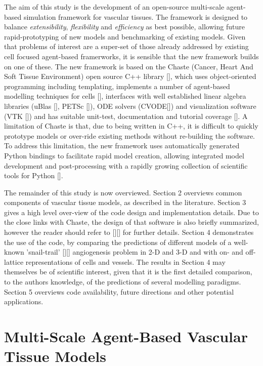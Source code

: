 \documentclass[superscriptaddress, a4paper]{article}
\begin{document}
The aim of this study is the development of an open-source multi-scale agent-based simulation framework for vascular tissues. The framework is designed to balance \emph{extensibility}, \emph{flexibility} and \emph{efficiency} as best possible, allowing future rapid-prototyping of new models and benchmarking of existing models. Given that problems of interest are a super-set of those already addressed by existing cell focused agent-based framerworks, it is sensible that the new framework builds on one of these. The new framework is based on the Chaste (Cancer, Heart And Soft Tissue Environment) open source C++ library [], which uses object-oriented programming including templating, implements a number of agent-based modelling techniques for cells [], interfaces with well established linear algebra libraries (uBlas [], PETSc []), ODE solvers (CVODE[]) and visualization software (VTK []) and has suitable unit-test, documentation and tutorial coverage []. A limitation of Chaste is that, due to being written in C++, it is difficult to quickly prototype models or over-ride existing methods without re-building the software. To address this limitation, the new framework uses automatically generated Python bindings to facilitate rapid model creation, allowing integrated model development and post-processing with a rapidly growing collection of scientific tools for Python [].

The remainder of this study is now overviewed. Section 2 overviews common components of vascular tissue models, as described in the literature. Section 3 gives a high level over-view of the code design and implementation details. Due to the close links with Chaste, the design of that software is also briefly summarized, however the reader should refer to [][] for further details. Section 4 demonstrates the use of the code, by comparing the predictions of different models of a well-known 'snail-trail' [][] angiogenesis problem in 2-D and 3-D and with on- and off-lattice representations of cells and vessels. The results in Section 4 may themselves be of scientific interest, given that it is the first detailed comparison, to the authors knowledge, of the predictions of several modelling paradigms. Section 5 overviews code availability, future directions and other potential applications.

\section{Multi-Scale Agent-Based Vascular Tissue Models}
\label{sec:modelling_overview}
\end{document}
